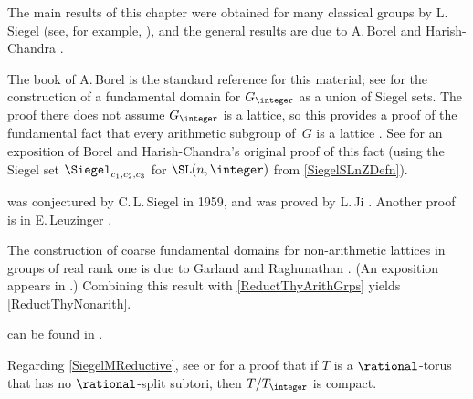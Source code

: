 \begin{notes}

The main results of this chapter were obtained for many classical groups by L.\,Siegel (see, for example, \cite{Siegel-DiscGrps}), and the general results are due to A.\,Borel and Harish-Chandra \cite{BorelHarishChandra-ArithSubgrps}.

The book of A.\,Borel \cite{Borel-IntroArithGrps} is the standard reference for this material; see \cite[Thm.~13.1, p.~90]{Borel-IntroArithGrps} for the construction of a fundamental domain for $G_\integer$ as a union of Siegel sets. The proof there does not assume $G_\integer$ is a lattice, so this provides a proof of the fundamental fact that every arithmetic 
subgroup of~$G$ is a lattice . See \cite[\S4.6]{PlatonovRapinchukBook} for an exposition of Borel and Harish-Chandra's original proof of this fact (using the Siegel set $\Siegel _{c_1,c_2,c_3}$ for $\SL(n,\integer)$ from \cref{SiegelSLnZDefn}).

 was conjectured by C.\,L.\,Siegel in 1959, and was proved by L.\,Ji \cite[Thm.~7.6]{Ji-MetricCompact}. Another proof is in E.\,Leuzinger \cite[Thm.~B]{Leuzinger-TitsGeometry}.

The construction of coarse fundamental domains for non-arithmetic lattices in groups of real rank one is due to Garland and Raghunathan \cite{GarlandRaghunathan-Rrank1}.
(An exposition appears in \cite[Chap.~13]{RaghunathanBook}.) Combining this result with \cref{ReductThyArithGrps} yields \cref{ReductThyNonarith}.

 can be found in \cite[Thm.~4.3, p.~203]{PlatonovRapinchukBook}.


Regarding \cref{SiegelMReductive}, see \cite[Prop.~8.5, p.~55]{Borel-IntroArithGrps} or \cite[Thm.~4.11, p.~208]{PlatonovRapinchukBook} for a proof that if $T$ is a $\rational$-torus that has no $\rational$-split subtori, then $T/T_\integer$ is compact.
\end{notes}


